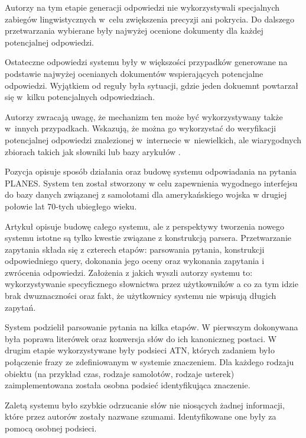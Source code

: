Autorzy \cite{brill2001data} na tym etapie generacji odpowiedzi nie wykorzystywali specjalnych zabiegów lingwistycznych w~celu zwiększenia precyzji ani pokrycia. Do dalszego przetwarzania wybierane były najwyżej ocenione dokumenty dla każdej potencjalnej odpowiedzi.

Ostateczne odpowiedzi systemu były w większości przypadków generowane na podstawie najwyżej ocenianych dokumentów wspierających potencjalne odpowiedzi. Wyjątkiem od reguły była sytuacji, gdzie jeden dokuemnt powtarzał się w~kilku potencjalnych odpowiedziach.

Autorzy \cite{brill2001data} zwracają uwagę, że mechanizm ten może być wykorzystywany także w~innych przypadkach. Wskazują, że można go wykorzystać do weryfikacji potencjalnej odpowiedzi znalezionej w~internecie w~niewielkich, ale wiarygodnych zbiorach takich jak słowniki lub bazy arykułów \cite{brill2001data}.

Pozycja \cite{waltz1978english} opisuje sposób działania oraz budowę systemu odpowiadania na pytania PLANES. System ten został stworzony w celu zapewnienia wygodnego interfejsu do bazy danych związanej z samolotami dla amerykańskiego wojska w drugiej połowie lat 70-tych ubiegłego wieku.

Artykuł \cite{waltz1978english} opisuje budowę całego systemu, ale z perspektywy tworzenia nowego systemu istotne są tylko kwestie związane z konstrukcją parsera. Przetwarzanie zapytania składa się z czterech etapów: parsowania pytania, konstrukcji odpowiedniego query, dokonania jego oceny oraz wykonania zapytania i zwrócenia odpowiedzi. Założenia z jakich wyszli autorzy systemu to: wykorzystywanie specyficznego słownictwa przez użytkowników a co za tym idzie brak dwuznaczności oraz fakt, że użytkownicy systemu nie wpisują długich zapytań.

System podzielił parsowanie pytania na kilka etapów. W pierwszym dokonywana była poprawa literówek oraz konwersja słów do ich kanoniczneg postaci. W drugim etapie wykorzystywane były podsieci ATN, których zadaniem było połączenie frazy ze zdefiniowanym w systemie znaczeniem. Dla każdego rodzaju obiektu (na przykład czas, rodzaje samolotów, rodzaje usterek) zaimplementowana została osobna podsieć identyfikująca znaczenie. 

Zaletą systemu było szybkie odrzucanie słów nie niosących żadnej informacji, które przez autorów \cite{waltz1978english} zostały nazwane szumami. Identyfikowane one były za pomocą osobnej podsieci. 

